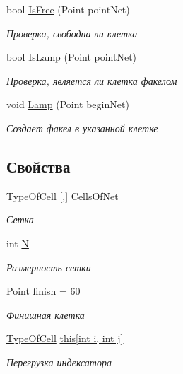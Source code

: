 \begin{DoxyCompactItemize}
bool \hyperlink{class_game_1_1_models_1_1_net_a025aa070144c06dac4138815c40909ed}{Is\+Free} (Point point\+Net)
\begin{DoxyCompactList}\small\item\em Проверка, свободна ли клетка \end{DoxyCompactList}\item 
bool \hyperlink{class_game_1_1_models_1_1_net_a1a5c1a64772f796f40803bee2f529439}{Is\+Lamp} (Point point\+Net)
\begin{DoxyCompactList}\small\item\em Проверка, является ли клетка факелом \end{DoxyCompactList}\item 
void \hyperlink{class_game_1_1_models_1_1_net_adad1b194504159a34c614c976abfd644}{Lamp} (Point begin\+Net)
\begin{DoxyCompactList}\small\item\em Создает факел в указанной клетке \end{DoxyCompactList}\end{DoxyCompactItemize}
\subsection*{Свойства}
\begin{DoxyCompactItemize}
\item 
\hyperlink{namespace_game_1_1_enums_ab6782702f41f926eb2b923ee03a88069}{Type\+Of\+Cell} \mbox{[},\mbox{]} \hyperlink{class_game_1_1_models_1_1_net_a57c0847ac8fc18813d364fc42cc201dc}{Cells\+Of\+Net}
\begin{DoxyCompactList}\small\item\em Сетка \end{DoxyCompactList}\item 
int \hyperlink{class_game_1_1_models_1_1_net_aa7d92ddfdbc6d8e1abe177c1ca81f668}{N}
\begin{DoxyCompactList}\small\item\em Размерность сетки \end{DoxyCompactList}\item 
Point \hyperlink{class_game_1_1_models_1_1_net_ab7d957b57aab1da2bcc9475689248bc6}{finish} = 60
\begin{DoxyCompactList}\small\item\em Финишная клетка \end{DoxyCompactList}\item 
\hyperlink{namespace_game_1_1_enums_ab6782702f41f926eb2b923ee03a88069}{Type\+Of\+Cell} \hyperlink{class_game_1_1_models_1_1_net_af5051726b673aa124d1d6d394ee94970}{this\mbox{[}int i, int j\mbox{]}}
\begin{DoxyCompactList}\small\item\em Перегрузка индексатора \end{DoxyCompactList}\end{DoxyCompactItemize}


